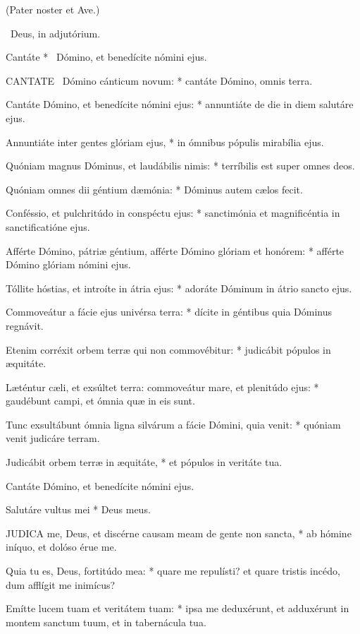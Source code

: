 (Pater noster et Ave.)

\V\ Deus, in adjutórium.

 Cantáte * \textdagger\ Dómino, et benedícite nómini ejus.


\lettrine[lines=2]{C}{ANTATE} \textdagger\ Dómino cánticum novum: * cantáte Dómino, omnis terra.

Cantáte Dómino, et benedícite nómini ejus: * annuntiáte de die in diem salutáre ejus.

Annuntiáte inter gentes glóriam ejus, * in ómnibus pópulis mirabília ejus.

Quóniam magnus Dóminus, et laudábilis nimis: * terríbilis est super omnes deos.

Quóniam omnes dii géntium dæmónia: * Dóminus autem cælos fecit.

Conféssio, et pulchritúdo in conspéctu ejus: * sanctimónia et magnificéntia in sanctificatióne ejus.

Afférte Dómino, pátriæ géntium, afférte Dómino glóriam et honórem: * afférte Dómino glóriam nómini ejus.

Tóllite hóstias, et introíte in átria ejus: * adoráte Dóminum in átrio sancto ejus.

Commoveátur a fácie ejus univérsa terra: * dícite in géntibus quia Dóminus regnávit.

Etenim corréxit orbem terræ qui non commovébitur: * judicábit pópulos in æquitáte.

Læténtur cæli, et exsúltet terra: commoveátur mare, et plenitúdo ejus: * gaudébunt campi, et ómnia quæ in eis sunt.

Tunc exsultábunt ómnia ligna silvárum a fácie Dómini, quia venit: * quóniam venit judicáre terram.

Judicábit orbem terræ in æquitáte, * et pópulos in veritáte tua.

 Cantáte Dómino, et benedícite nómini ejus.

 Salutáre vultus mei * Deus meus.


\lettrine[lines=2]{J}{UDICA} me, Deus, et discérne causam meam de gente non sancta, * ab hómine iníquo, et dolóso érue me.

Quia tu es, Deus, fortitúdo mea: * quare me repulísti? et quare tristis incédo, dum afflígit me inimícus?

Emítte lucem tuam et veritátem tuam: * ipsa me deduxérunt, et adduxérunt in montem sanctum tuum, et in tabernácula tua.

